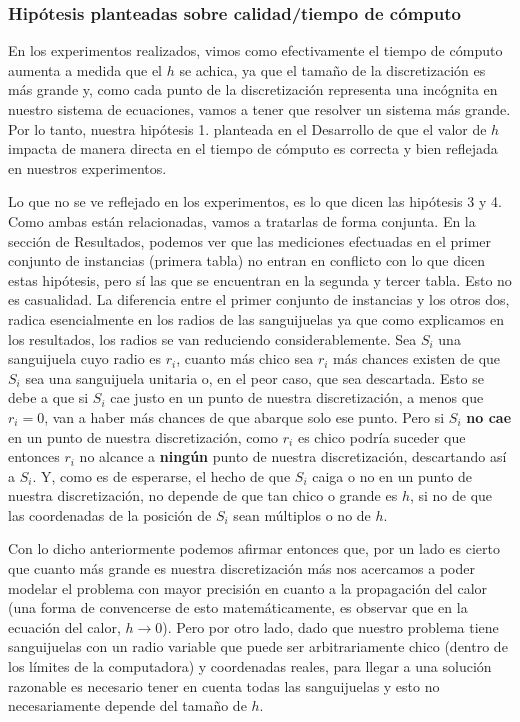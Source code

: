 \subsubsection{Hipótesis planteadas sobre calidad/tiempo de cómputo}
\par En los experimentos realizados, vimos como efectivamente el tiempo de cómputo aumenta a medida que el $h$ se achica, ya que el tamaño de la discretización es más grande y, como cada punto de la discretización representa una incógnita en nuestro sistema de ecuaciones, vamos a tener que resolver un sistema más grande. Por lo tanto, nuestra hipótesis 1. planteada en el Desarrollo de que el valor de $h$ impacta de manera directa en el tiempo de cómputo es correcta y bien reflejada en nuestros experimentos.
\par Lo que no se ve reflejado en los experimentos, es lo que dicen las hipótesis 3 y 4. Como ambas están relacionadas, vamos a tratarlas de forma conjunta. En la sección de Resultados, podemos ver que las mediciones efectuadas en el primer conjunto de instancias (primera tabla) no entran en conflicto con lo que dicen estas hipótesis, pero sí las que se encuentran en la segunda y tercer tabla. Esto no es casualidad. La diferencia entre el primer conjunto de instancias y los otros dos, radica esencialmente en los radios de las sanguijuelas ya que como explicamos en los resultados, los radios se van reduciendo considerablemente. Sea  $S_i$ una sanguijuela cuyo radio es $r_i$, cuanto más chico sea $r_i$ más chances existen de que $S_i$ sea una sanguijuela unitaria o, en el peor caso, que sea descartada. Esto se debe a que si $S_i$ cae justo en un punto de nuestra discretización, a menos que $r_i = 0$, van a haber más chances de que abarque solo ese punto. Pero si $S_i$ \textbf{no cae} en un punto de nuestra discretización, como $r_i$ es chico podría suceder que entonces $r_i$ no alcance a \textbf{ningún} punto de nuestra discretización, descartando así a $S_i$. Y, como es de esperarse, el hecho de que $S_i$ caiga o no en un punto de nuestra discretización, no depende de que tan chico o grande es $h$, si no de que las coordenadas de la posición de $S_i$ sean múltiplos o no de $h$.
\par Con lo dicho anteriormente podemos afirmar entonces que, por un lado es cierto que cuanto más grande es nuestra discretización más nos acercamos a poder modelar el problema con mayor precisión en cuanto a la propagación del calor (una forma de convencerse de esto matemáticamente, es observar que en la ecuación del calor, $h\to 0$). Pero por otro lado, dado que nuestro problema tiene sanguijuelas con un radio variable que puede ser arbitrariamente chico (dentro de los límites de la computadora) y coordenadas reales, para llegar a una solución razonable es necesario tener en cuenta todas las sanguijuelas y esto no necesariamente depende del tamaño de $h$.
